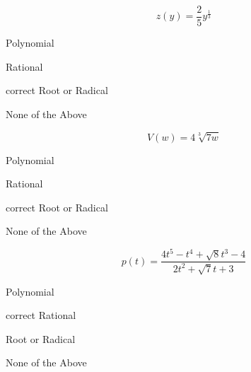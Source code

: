 \documentclass{ximera}
\begin{document}
\begin{exercise}
\begin{question}
\end{question}











\begin{question}


\[
z(y) = \frac{2}{5} y^{\tfrac{1}{3}}
\]

\begin{multipleChoice}
\item {Polynomial}
\item {Rational}
\item [correct]{Root or Radical}
\item {None of the Above}
\end{multipleChoice}


\end{question}










\begin{question}


\[
V(w) = 4 \sqrt[3]{7w}
\]

\begin{multipleChoice}
\item {Polynomial}
\item {Rational}
\item [correct]{Root or Radical}
\item {None of the Above}
\end{multipleChoice}


\end{question}













\begin{question}


\[
p(t) = \frac{4t^5 - t^4 + \sqrt{8} t^3 - 4}{2t^2 + \sqrt{7} t + 3}
\]

\begin{multipleChoice}
\item {Polynomial}
\item [correct]{Rational}
\item {Root or Radical}
\item {None of the Above}
\end{multipleChoice}



\end{question}
\end{exercise}
\end{document}
